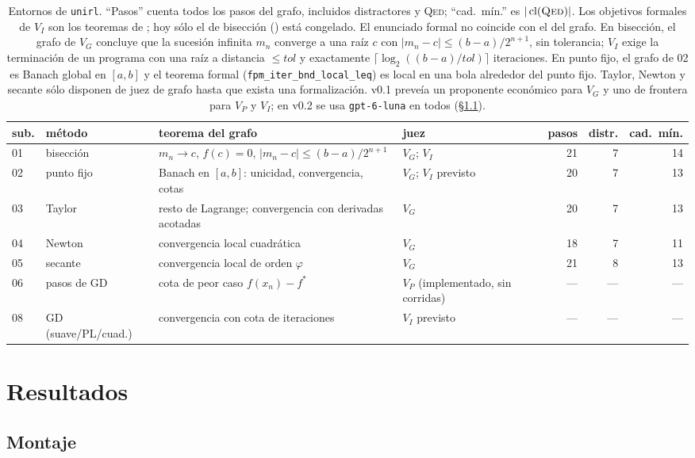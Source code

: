 \documentclass[11pt,a4paper]{article}
\theoremstyle{definition}
\theoremstyle{remark}
\newcommand{\lab}[1]{\textsc{#1}}
\newcommand{\cl}{\operatorname{cl}}
\newcommand{\id}[1]{\texttt{\detokenize{#1}}}
\begin{document}
\begin{table}[!ht]
\centering
\footnotesize
\begin{tabular}{@{}l>{\raggedright}p{2.0cm}>{\raggedright}p{4.0cm}>{\raggedright}p{3.3cm}rrr@{}}
\toprule
sub. & método & teorema del grafo & juez & pasos & distr. & cad.\ mín. \tabularnewline
\midrule
01 & bisección & $m_n \to c$, $f(c)=0$, $|m_n - c| \le (b-a)/2^{n+1}$ & $V_G$; $V_I$ & 21 & 7 & 14 \tabularnewline
02 & punto fijo & Banach en $[a,b]$: unicidad, convergencia, cotas & $V_G$; $V_I$ previsto & 20 & 7 & 13 \tabularnewline
03 & Taylor & resto de Lagrange; convergencia con derivadas acotadas & $V_G$ & 20 & 7 & 13 \tabularnewline
04 & Newton & convergencia local cuadrática & $V_G$ & 18 & 7 & 11 \tabularnewline
05 & secante & convergencia local de orden $\varphi$ & $V_G$ & 21 & 8 & 13 \tabularnewline
06 & pasos de GD & cota de peor caso $f(x_n)-f^*$ & $V_P$ (implementado, sin corridas) & --- & --- & --- \tabularnewline
08 & GD (suave/PL/cuad.) & convergencia con cota de iteraciones & $V_I$ previsto & --- & --- & --- \tabularnewline
\bottomrule
\end{tabular}
\caption{Entornos de \texttt{unirl}. ``Pasos'' cuenta todos los pasos del grafo, incluidos distractores y \lab{Qed}; ``cad.\ mín.'' es $|\cl(\lab{Qed})|$. Los objetivos formales de $V_I$ son los teoremas de \citet{BryantHuertaFoster2026}; hoy sólo el de bisección (\id{bisection_error_bound}) está congelado. El enunciado formal no coincide con el del grafo. En bisección, el grafo de $V_G$ concluye que la sucesión infinita $m_n$ converge a una raíz $c$ con $|m_n - c| \le (b-a)/2^{n+1}$, sin tolerancia; $V_I$ exige la terminación de un programa con una raíz a distancia $\le \mathit{tol}$ y exactamente $\lceil \log_2((b-a)/\mathit{tol}) \rceil$ iteraciones. En punto fijo, el grafo de 02 es Banach global en $[a,b]$ y el teorema formal (\texttt{fpm\_iter\_bnd\_\allowbreak{}local\_leq}) es local en una bola alrededor del punto fijo. Taylor, Newton y secante sólo disponen de juez de grafo hasta que exista una formalización. v0.1 preveía un proponente económico para $V_G$ y uno de frontera para $V_P$ y $V_I$; en v0.2 se usa \texttt{gpt-6-luna} en todos (§\ref{sec:montaje}).}
\label{tab:envs}
\end{table}

\section{Resultados}\label{sec:resultados}

\subsection{Montaje}\label{sec:montaje}
\end{document}
